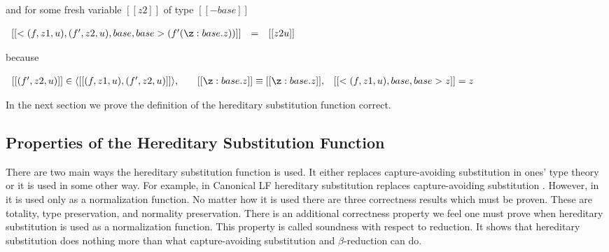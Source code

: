 \begin{example}
\begin{center}
\begin{math}
\begin{array}{lll}
      \end{array}
    \end{math}
  \end{center}
    and for some fresh variable $[[z2]]$ of type $[[{-base}]]$
    \begin{center}
    \begin{math}
      \begin{array}{lll}
        [[<(f,z1,u),(f',z2,u),base,base>(f' (\z:base.z))]]  & = & [[z2 u]]\\
      \end{array}
    \end{math}
  \end{center}
  because
  \begin{center}
    \begin{math}
      \begin{array}{llllll}
        [[(f',z2,u)]] \in \langle[[(f,z1,u),(f',z2,u)]]\rangle, &
        &
        [[\z:base.z]] \equiv [[\z:base.z]],
        &
        [[<(f,z1,u),base,base>z]] = z
      \end{array}
    \end{math}
  \end{center}
\end{example}
In the next section we prove the definition of the hereditary substitution function correct.

\subsection{Properties of the Hereditary Substitution Function}
\label{subsec:properties_of_the_hereditary_substitution_function}
There are two main ways the hereditary substitution function is used.
It either replaces capture-avoiding substitution in ones' type theory
or it is used in some other way.  For example, in Canonical LF
hereditary substitution replaces capture-avoiding substitution
\cite{Watkins:2004,Adams:2004}.  However, in \cite{Abel:2008} it is
used only as a normalization function.  No matter how it is used there
are three correctness results which must be proven.  These are
totality, type preservation, and normality preservation.  There is an
additional correctness property we feel one must prove when hereditary
substitution is used as a normalization function.  This property is
called soundness with respect to reduction.  It shows that hereditary
substitution does nothing more than what capture-avoiding substitution
and $\beta$-reduction can do.


